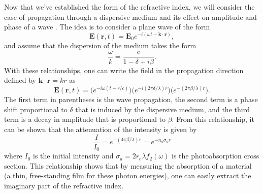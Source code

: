 Now that we've established the form of the refractive index, we will consider the case of propagation through a dispersive medium and its effect on amplitude and phase of a wave \cite{attwoodSoftXraysExtreme2000}. The idea is to consider a plane wave of the form
\begin{equation}
	\mathbf{E}(\mathbf{r},t)=\mathbf{E}_0e^{-i(\omega t - \mathbf{k}\cdot\mathbf{r})},
\end{equation}
and assume that the dispersion of the medium takes the form
\begin{equation}
	\frac{\omega}{k}=\frac{c}{1-\delta+i\beta}.
\end{equation}
With these relationships, one can write the field in the propagation direction defined by $\mathbf{k}\cdot\mathbf{r}=kr$ as
\begin{equation}
\label{eqn:wave_prop}
	\mathbf{E}(\mathbf{r},t)=\big(e^{-i\omega(t - r/c)}\big) \big(e^{-i(2\pi\delta/\lambda)r}\big) \big(e^{-(2\pi\beta/\lambda)r}\big).
\end{equation}
The first term in parentheses is the wave propagation, the second term is a phase shift proportional to $\delta$ that is induced by the dispersive medium, and the third term is a decay in amplitude that is proportional to $\beta$.  From this relationship, it can be shown that the attenuation of the intensity is given by 
\begin{equation}
\label{eqn:beer-lambert}
	\frac{I}{I_0}=e^{-(4\pi\beta/\lambda)r}=e^{-n_a \sigma_a r}
\end{equation}
where $I_0$ is the initial intensity and $\sigma_a=2r_e \lambda f_2(\omega)$ is the photoabsorption cross section.  This relationship shows that by measuring the absorption of a material (a thin, free-standing film for these photon energies), one can easily extract the imaginary part of the refractive index.

